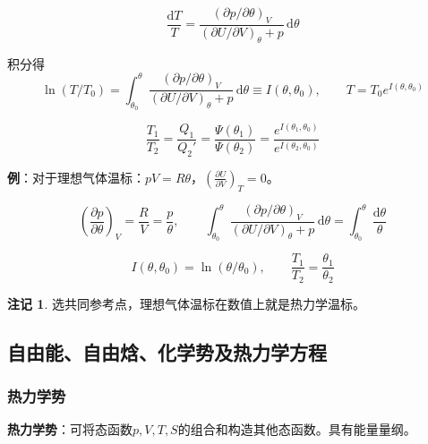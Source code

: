 \documentclass[UTF8]{ctexart}
\theoremstyle{definition}
\newtheorem{remark}{注记}
\begin{document}
\begin{equation}
\frac{\mathrm{d}T}{T} = \frac{(\partial p/\partial\theta)_V}{(\partial U/\partial V)_\theta + p}\,\mathrm{d}\theta
\end{equation}

积分得
\begin{equation}
\ln(T/T_0) = \int_{\theta_0}^{\theta}\frac{(\partial p/\partial\theta)_V}{(\partial U/\partial V)_\theta + p}\,\mathrm{d}\theta \equiv I(\theta,\theta_0),\qquad T = T_0 e^{I(\theta,\theta_0)}
\end{equation}

\begin{equation}
\frac{T_1}{T_2} = \frac{Q_1}{Q_2'} = \frac{\Psi(\theta_1)}{\Psi(\theta_2)} = \frac{e^{I(\theta_1,\theta_0)}}{e^{I(\theta_2,\theta_0)}}
\end{equation}

\textbf{例}：对于理想气体温标：$pV=R\theta$，$\displaystyle\left(\frac{\partial U}{\partial V}\right)_T = 0$。

\begin{equation}
\left(\frac{\partial p}{\partial\theta}\right)_V = \frac{R}{V} = \frac{p}{\theta},\qquad
\int_{\theta_0}^{\theta}\frac{(\partial p/\partial\theta)_V}{(\partial U/\partial V)_\theta + p}\,\mathrm{d}\theta = \int_{\theta_0}^{\theta}\frac{\mathrm{d}\theta}{\theta}
\end{equation}

\begin{equation}
I(\theta,\theta_0) = \ln(\theta/\theta_0),\qquad \frac{T_1}{T_2} = \frac{\theta_1}{\theta_2}
\end{equation}

\begin{remark}
选共同参考点，理想气体温标在数值上就是热力学温标。
\end{remark}

\subsection{自由能、自由焓、化学势及热力学方程}

\subsubsection*{热力学势}

\textbf{热力学势}：可将态函数$p,V,T,S$的组合和构造其他态函数。具有能量量纲。
\end{document}
